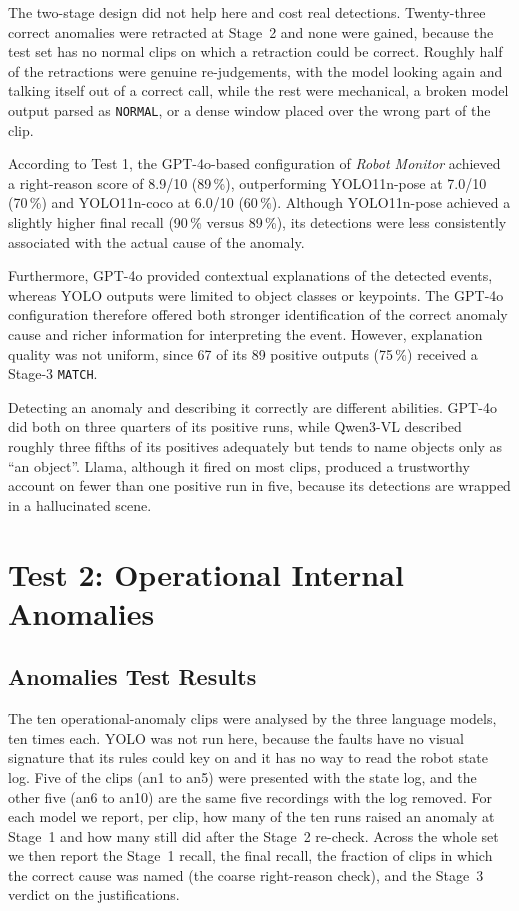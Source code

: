 \documentclass[11pt,a4paper]{article}
\begin{document}
The two-stage design did not help here and cost real detections.
Twenty-three correct anomalies were retracted at Stage~2 and none were
gained, because the test set has no normal clips on which a retraction
could be correct. Roughly half of the retractions were genuine
re-judgements, with the model looking again and talking itself out of a
correct call, while the rest were mechanical, a broken model output parsed
as \texttt{NORMAL}, or a dense window placed over the wrong part of the
clip.

According to Test 1, the GPT-4o-based configuration of \textit{Robot
Monitor} achieved a right-reason score of 8.9/10 (89\,\%), outperforming
YOLO11n-pose at 7.0/10 (70\,\%) and YOLO11n-coco at 6.0/10 (60\,\%).
Although YOLO11n-pose achieved a slightly higher final recall (90\,\%
versus 89\,\%), its detections were less consistently associated with the
actual cause of the anomaly.

Furthermore, GPT-4o provided contextual explanations of the detected
events, whereas YOLO outputs were limited to object classes or keypoints.
The GPT-4o configuration therefore offered both stronger identification of
the correct anomaly cause and richer information for interpreting the
event. However, explanation quality was not uniform, since 67 of its 89
positive outputs (75\,\%) received a Stage-3 \texttt{MATCH}.

Detecting an anomaly and describing it correctly are different abilities.
GPT-4o did both on three quarters of its positive runs, while Qwen3-VL
described roughly three fifths of its positives adequately but tends to
name objects only as ``an object''. Llama, although it fired on most
clips, produced a trustworthy account on fewer than one positive run in
five, because its detections are wrapped in a hallucinated scene.

\section{Test 2: Operational Internal Anomalies}
\label{sec:test2}

\subsection{Anomalies Test Results}

The ten operational-anomaly clips were analysed by the three language
models, ten times each. YOLO was not run here, because the faults have no
visual signature that its rules could key on and it has no way to read the
robot state log. Five of the clips (an1 to an5) were presented with the
state log, and the other five (an6 to an10) are the same five recordings
with the log removed. For each model we report, per clip, how many of the
ten runs raised an anomaly at Stage~1 and how many still did after the
Stage~2 re-check. Across the whole set we then report the Stage~1 recall,
the final recall, the fraction of clips in which the correct cause was
named (the coarse right-reason check), and the Stage~3 verdict on the
justifications.
\end{document}

